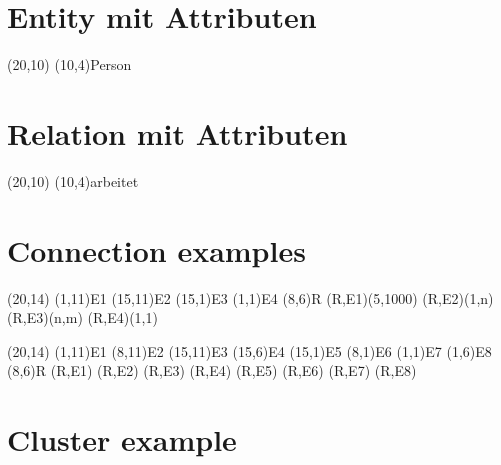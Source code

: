 \documentclass[a4paper,11pt]{article}
\begin{document}
\section{Entity mit Attributen}

\begin{schema}(20,10)
  \entity(10,4){Person}
\end{schema}

\section{Relation mit Attributen}

\begin{schema}(20,10)
  \relation(10,4){arbeitet}
\end{schema}

\section{Connection examples}

\begin{schema}(20,14)
  \entity(1,11){E1}
  \entity(15,11){E2}
  \entity(15,1){E3}
  \entity(1,1){E4}
  \relation(8,6){R}
  \conn(R,E1){(5,1000)}
  \conn(R,E2){(1,n)}
  \conn(R,E3){(n,m)}
  \conn(R,E4){(1,1)}
\end{schema}

\begin{schema}(20,14)
  \entity(1,11){E1}
  \entity(8,11){E2}
  \entity(15,11){E3}
  \entity(15,6){E4}
  \entity(15,1){E5}
  \entity(8,1){E6}
  \entity(1,1){E7}
  \entity(1,6){E8}
  \relation(8,6){R}
  \conn(R,E1){}
  \conn(R,E2){}
  \conn(R,E3){}
  \conn(R,E4){}
  \conn(R,E5){}
  \conn(R,E6){}
  \conn(R,E7){}
  \conn(R,E8){}
\end{schema}

\section{Cluster example}
\end{document}
